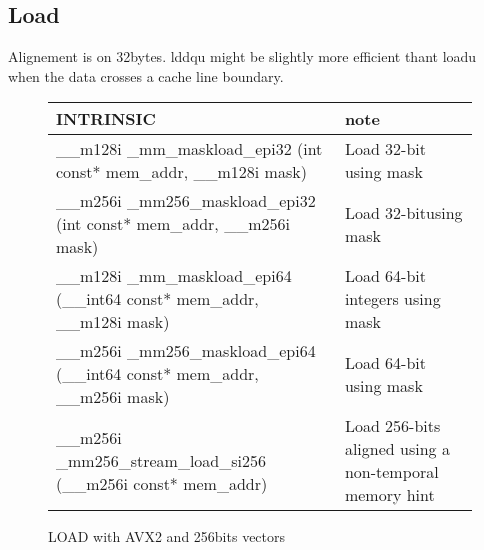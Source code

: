 \documentclass{article}
\begin{document}
\subsection{Load}
Alignement is on 32bytes.  lddqu might be slightly more efficient thant loadu when the data crosses a cache line boundary.
\vspace{1cm}
\begin{figure}[h!]
\noindent
\noindent\begin{tabular}{|l|l|}
  \hline
  INTRINSIC & note \\
  \hline
\_\_m128i \_mm\_maskload\_epi32 (int const* mem\_addr, \_\_m128i mask) & Load 32-bit using mask \\
  \hline
  \_\_m256i \_mm256\_maskload\_epi32 (int const* mem\_addr, \_\_m256i mask) & Load 32-bitusing mask \\
\_\_m128i \_mm\_maskload\_epi64 (\_\_int64 const* mem\_addr, \_\_m128i mask) &  Load 64-bit integers using mask \\
\hline
\_\_m256i \_mm256\_maskload\_epi64 (\_\_int64 const* mem\_addr, \_\_m256i mask) & Load 64-bit using mask \\
\hline
\_\_m256i \_mm256\_stream\_load\_si256 (\_\_m256i const* mem\_addr) & Load 256-bits aligned using a non-temporal memory hint \\


  \hline
\end{tabular}
\caption{LOAD with AVX2 and 256bits vectors}
\label{fig:load AVX2 256bits instructions}
\end{figure}

\newpage
\end{document}
